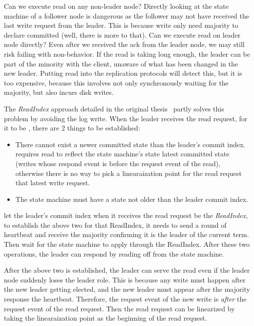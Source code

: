 Can we execute read on any non-leader node? Directly looking at the state
machine of a follower node is dangerous as the follower may not have received
the last write request from the leader. This is because write only need
majority to declare committed (well, there is more to that). Can we execute
read on leader node directly? Even after we received the ack from the leader
node, we may still risk failing with non-\Lconsistent behavior. If the read
is taking long enough, the leader can be part of the minority with the
client, unaware of what has been changed in the new leader. Putting read into
the replication protocols will detect this, but it is too expensive, because
this involves not only synchronously waiting for the majority, but also
incurs disk writes.

The \textit{ReadIndex} approach detailed in the original
thesis~\cite{ongaro2014consensus} partly solves this problem by avoiding the
log write. When the leader receives the read request, for it to be \Lconsistent,
there are 2 things to be established:
\begin{itemize}
    \item There cannot exist a newer committed state than the leader's commit
    index. \LConsistent requires read to reflect the state machine's state
    latest committed state (writes whose respond event is before the request
    event of the read), otherwise there is no way to pick a linearaization
    point for the read request that latest write request.
    \item The state machine must have a state not older than the leader
    commit index.
\end{itemize}
let the leader's commit index when it receives the read request be the
\textit{ReadIndex}, to establish the above two for that ReadIndex, it needs to
send a round of heartbeat and receive the majority confirming it is the
leader of the current term. Then wait for the state machine to apply through
the ReadIndex. After these two operations, the leader can respond by reading
off from the state machine.

After the above two is established, the leader can serve the read even if the
leader node suddenly loses the leader role. This is because any write must
happen after the new leader getting elected, and the new leader must appear after
the majority response the heartbeat. Therefore, the request event of the new
write is \textit{after} the request event of the read request. Then the read
request can be linearized by taking the linearaization point as the beginning
of the read request.


